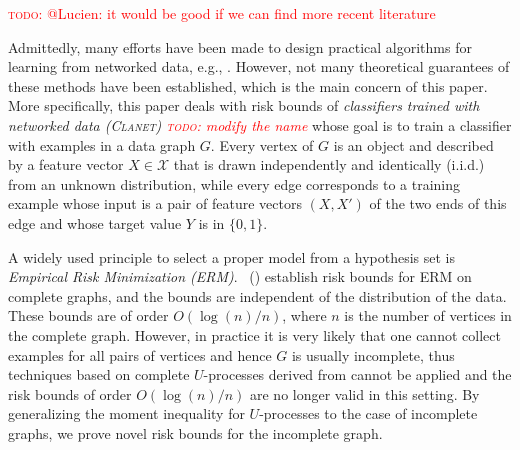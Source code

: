 \documentclass[letterpaper]{article} %
\newcommand{\xspace}{\mathcal{X}}
\newcommand{\pair}[1]{(#1)}
\newcommand{\problemabbr}{\textnormal{C}\textsc{lanet}}
\newcommand{\set}[1]{\{#1\}}
\newcommand{\red}[1]{\textcolor{red}{#1}}
\newcommand{\todo}[1]{\red{\textsc{todo:} #1}}
\newcommand{\citet}[1]{\citeauthor{#1}\ (\citeyear{#1})}
\begin{document}
\todo{@Lucien: it would be good if we can find more recent literature}

Admittedly, many efforts have been made to design practical algorithms for learning from networked data, e.g., \cite{liben2007link,macskassy2007classification,li2016robust,garcia2016combining}. 
However, not many theoretical guarantees of these methods have been established, which is the main concern of this paper. More specifically, this paper deals with risk bounds of \emph{classifiers trained with networked data (\problemabbr{}) \todo{modify the name}} whose goal is to train a classifier with examples in a data graph $G$. 
Every vertex of $G$ is an object and described by a feature vector $X\in \xspace{}$ that is drawn independently and identically (i.i.d.) from an unknown distribution, while every edge corresponds to a training example whose input is a pair of feature vectors $\pair{X,X'}$ of the two ends of this edge and whose target value $Y$ is in $\{0,1\}$.

A widely used principle to select a proper model from a hypothesis set is \emph{Empirical Risk Minimization (ERM)}. %
\citet{papa2016graph} establish risk bounds for ERM on complete graphs, and the bounds are independent of the distribution of the data. 
These bounds are of order $O(\log(n)/n)$, where $n$ is the number of vertices in the complete graph. 
However, in practice it is very likely that one cannot collect examples for all pairs of vertices and hence $G$ is usually incomplete, thus techniques based on complete $U$-processes derived from \cite{papa2016graph} cannot be applied and the risk bounds of order $O(\log(n)/n)$ are no longer valid in this setting. 
By generalizing the moment inequality for $U$-processes to the case of incomplete graphs, we prove novel risk bounds for the incomplete graph.  
\end{document}
